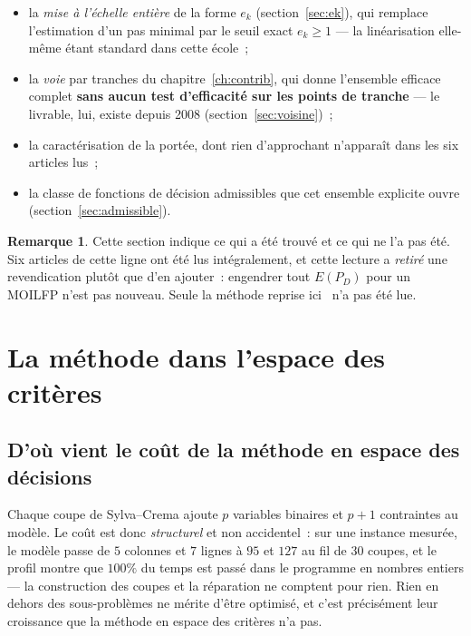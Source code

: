 \documentclass[12pt,a4paper]{report}
\newcommand{\E}{E(P_D)}
\theoremstyle{plain}
\theoremstyle{definition}
\newtheorem{remarque}[theoreme]{Remarque}
\begin{document}
\begin{itemize}[itemsep=3pt]
\item la \emph{mise à l'échelle entière} de la forme $e_k$
      (section~\ref{sec:ek}), qui remplace l'estimation d'un pas minimal par
      le seuil exact $e_k \geqslant 1$ --- la linéarisation elle-même étant
      standard dans cette école~;
\item la \emph{voie} par tranches du chapitre~\ref{ch:contrib}, qui donne
      l'ensemble efficace complet \textbf{sans aucun test d'efficacité sur
      les points de tranche} --- le livrable, lui, existe depuis 2008
      (section~\ref{sec:voisine})~;
\item la caractérisation de la portée, dont rien d'approchant n'apparaît dans
      les six articles lus~;
\item la classe de fonctions de décision admissibles que cet ensemble explicite
      ouvre (section~\ref{sec:admissible}).
\end{itemize}

\begin{remarque}
Cette section indique ce qui a été trouvé et ce qui ne l'a pas été.  Six
articles de cette ligne ont été lus intégralement, et cette lecture a
\emph{retiré} une revendication plutôt que d'en ajouter~: engendrer tout
$\E$ pour un MOILFP n'est pas nouveau.  Seule la méthode reprise
ici~\cite{younsiabbaci2025} n'a pas été lue.
\end{remarque}

\chapter{La méthode dans l'espace des critères}
\label{ch:methode}

\section{D'où vient le coût de la méthode en espace des décisions}
\label{sec:cout}

Chaque coupe de Sylva--Crema ajoute $p$ variables binaires et $p+1$ contraintes
au modèle.  Le coût est donc \emph{structurel} et non accidentel~: sur une
instance mesurée, le modèle passe de $5$ colonnes et $7$ lignes à $95$ et
$127$ au fil de $30$ coupes, et le profil montre que $100\%$ du temps est passé
dans le programme en nombres entiers --- la construction des coupes et la
réparation ne comptent pour rien.  Rien en dehors des sous-problèmes ne mérite
d'être optimisé, et c'est précisément leur croissance que la méthode en espace
des critères n'a pas.
\end{document}
